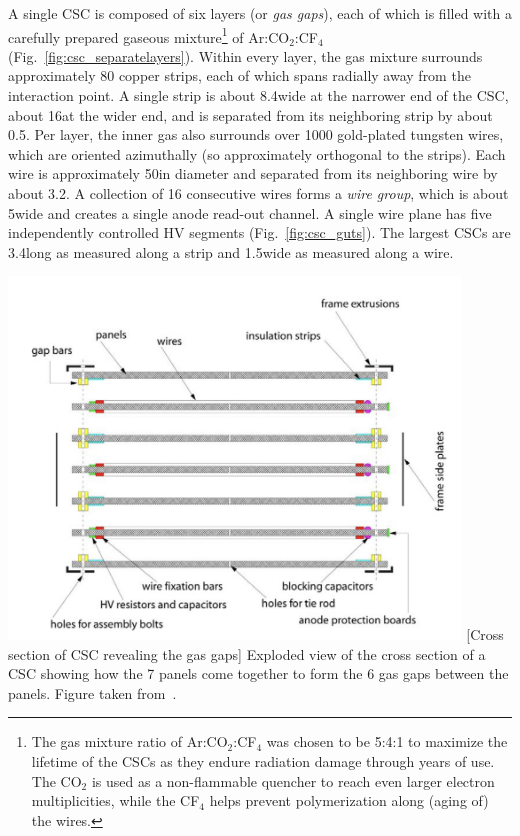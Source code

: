 A single CSC is composed of six layers (or \emph{gas gaps}), each of which is filled with a carefully prepared gaseous mixture\footnote{
    The gas mixture ratio of Ar:CO$_{2}$:CF$_{4}$ was chosen to be 5:4:1 to maximize the lifetime of the CSCs as they endure radiation damage through years of use.
    The CO$_{2}$ is used as a non-flammable quencher to reach even larger electron multiplicities, while the CF$_{4}$ helps prevent polymerization along (aging of) the wires.
    }
of Ar:CO$_{2}$:CF$_{4}$ (Fig.~\ref{fig:csc_separatelayers}).
Within every layer, the gas mixture surrounds approximately 80 copper strips, each of which spans radially away from the interaction point.
A single strip is about 8.4\mm wide at the narrower end of the CSC, about 16\mm at the wider end, and is separated from its neighboring strip by about 0.5\mm.
Per layer, the inner gas also surrounds over 1000 gold-plated tungsten wires, which are oriented azimuthally (so approximately orthogonal to the strips).
Each wire is approximately 50\mum in diameter and separated from its neighboring wire by about 3.2\mm.
A collection of 16 consecutive wires forms a \emph{wire group}, which is about 5\cm wide and creates a single anode read-out channel.
A single wire plane has five independently controlled HV segments (Fig.~\ref{fig:csc_guts}).
The largest CSCs are 3.4\meter long as measured along a strip and 1.5\meter wide as measured along a wire.
\begin{multiFigure}
    \centering
    \includegraphics[width=0.9\textwidth,keepaspectratio]{figures/cms/muonsys/csc_separatedlayers.jpeg}
        [Cross section of CSC revealing the gas gaps]
        {Exploded view of the cross section of a CSC showing how the 7 panels come together to form the 6 gas gaps between the panels.
        Figure taken from~\cite{collaboration_cms_2008}.
        }
    \label{fig:csc_separatelayers}
\end{multiFigure}
